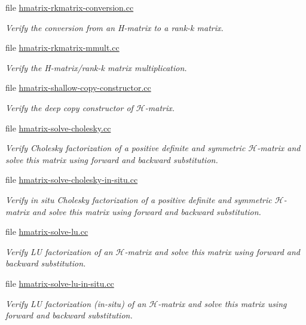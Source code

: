 \begin{DoxyCompactItemize}
file \hyperlink{hmatrix-rkmatrix-conversion_8cc}{hmatrix-\/rkmatrix-\/conversion.\+cc}
\begin{DoxyCompactList}\small\item\em Verify the conversion from an H-\/matrix to a rank-\/k matrix. \end{DoxyCompactList}\item 
file \hyperlink{hmatrix-rkmatrix-mmult_8cc}{hmatrix-\/rkmatrix-\/mmult.\+cc}
\begin{DoxyCompactList}\small\item\em Verify the H-\/matrix/rank-\/k matrix multiplication. \end{DoxyCompactList}\item 
file \hyperlink{hmatrix-shallow-copy-constructor_8cc}{hmatrix-\/shallow-\/copy-\/constructor.\+cc}
\begin{DoxyCompactList}\small\item\em Verify the deep copy constructor of $\mathcal{H}$-\/matrix. \end{DoxyCompactList}\item 
file \hyperlink{hmatrix-solve-cholesky_8cc}{hmatrix-\/solve-\/cholesky.\+cc}
\begin{DoxyCompactList}\small\item\em Verify Cholesky factorization of a positive definite and symmetric $\mathcal{H}$-\/matrix and solve this matrix using forward and backward substitution. \end{DoxyCompactList}\item 
file \hyperlink{hmatrix-solve-cholesky-in-situ_8cc}{hmatrix-\/solve-\/cholesky-\/in-\/situ.\+cc}
\begin{DoxyCompactList}\small\item\em Verify in situ Cholesky factorization of a positive definite and symmetric $\mathcal{H}$-\/matrix and solve this matrix using forward and backward substitution. \end{DoxyCompactList}\item 
file \hyperlink{hmatrix-solve-lu_8cc}{hmatrix-\/solve-\/lu.\+cc}
\begin{DoxyCompactList}\small\item\em Verify LU factorization of an $\mathcal{H}$-\/matrix and solve this matrix using forward and backward substitution. \end{DoxyCompactList}\item 
file \hyperlink{hmatrix-solve-lu-in-situ_8cc}{hmatrix-\/solve-\/lu-\/in-\/situ.\+cc}
\begin{DoxyCompactList}\small\item\em Verify LU factorization (in-\/situ) of an $\mathcal{H}$-\/matrix and solve this matrix using forward and backward substitution. \end{DoxyCompactList}\item 

\end{DoxyCompactItemize}
